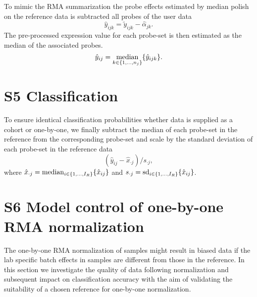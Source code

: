 \documentclass{article}
\begin{document}
To mimic the RMA summarization the probe effects estimated by median polish on the reference data is subtracted all probes of the user data
\begin{equation*}
   \hat{y}_{ijk} = \tilde{y}_{ijk} - \hat{\alpha}_{jk}.
\end{equation*}
The pre-processed expression value for each probe-set is then estimated as the median of the associated probes.
\begin{equation*}
   \hat{y}_{ij} = \operatorname*{median}_{k \in \{1,\dots,n_j \}} \{ \hat{y}_{ijk} \}.
\end{equation*}


\section*{S5 Classification}
To ensure identical classification probabilities whether data is supplied as a cohort or one-by-one, we finally subtract the median of each probe-set in the reference from the corresponding probe-set and scale by the standard deviation of each probe-set in the reference data
\begin{equation*}
  (\hat{y}_{ij} - \hat{x}_{\cdot j})/s_{\cdot j},
\end{equation*}
where
$\hat{x}_{\cdot j} = \operatorname*{median}_{i \in \{1,\dots,I_R \}} \{\hat{x}_{ij}\}$ and
$s_{\cdot j} = \operatorname*{sd}_{i \in \{1,\dots,I_R\}} \{\hat{x}_{ij}\}$.


\section*{S6 Model control of one-by-one RMA normalization} \label{sec:rle}
The one-by-one RMA normalization of samples might result in biased data if the lab specific batch effects in samples are different from those in the reference. In this section we investigate the quality of data following normalization and subsequent impact on classification accuracy with the aim of validating the suitability of a chosen reference for one-by-one normalization.
\end{document}
